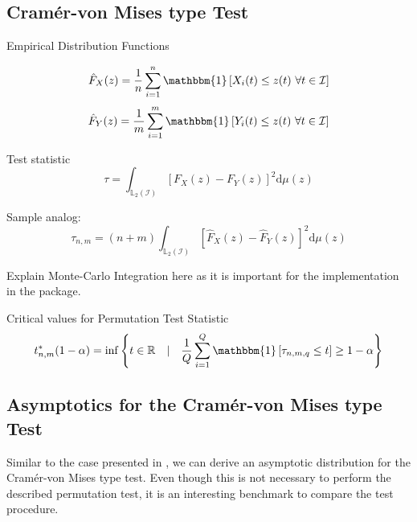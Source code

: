 \documentclass[12pt, a4paper]{article}
\theoremstyle{MAstyle} \newtheorem{assumption}{Assumption}[section]
\theoremstyle{MAstyle} \newtheorem{definition}{Definition}[section]
\begin{document}
		\subsection{Cram\'{e}r-von Mises type Test}
		
			Empirical Distribution Functions
			\begin{multicols}{2}
				\noindent
				\begin{equation*}
					\hat{F}_X(z) = \frac{1}{n} \sum_{i = 1}^{n}\mathbbm{1}\left[X_i(t) \leq z(t) \ \forall t \in \mathcal{I}\right]
				\end{equation*}
				\begin{equation}
					\hat{F}_Y(z) = \frac{1}{m} \sum_{i = 1}^{m}\mathbbm{1}\left[Y_i(t) \leq z(t) \ \forall t \in \mathcal{I}\right]
				\end{equation}
			\end{multicols}
			
			
			Test statistic
			\begin{equation}
				\tau = \int_{\mathbb{L}_2(\mathcal{I})}\left[F_X(z) - F_Y(z)\right]^2 \mathrm{d} \mu(z)
			\end{equation}
			
			Sample analog:
			\begin{equation}
				\tau_{n,m} = (n+m) \int_{\mathbb{L}_2(\mathcal{I})}\left[\hat{F}_X(z) - \hat{F}_Y(z)\right]^2 \mathrm{d} \mu(z)
			\end{equation}
		
			{\color{red} Explain Monte-Carlo Integration here as it is important for the implementation in the package.}
		
			Critical values for Permutation Test Statistic
			\begin{equation}
				t^{*}_{n,m}(1-\alpha) = \inf \left\{t \in \mathbb{R} \quad \vert \quad \frac{1}{Q} \sum_{i = 1}^{Q} \mathbbm{1}\left[\tau_{n,m,q} \leq t\right] \geq 1 - \alpha \right\}
			\end{equation}
		
		\subsection{Asymptotics for the Cram\'{e}r-von Mises type Test}
			Similar to the case presented in \cite{bugni_goodness--fit_2009}, we can derive an asymptotic distribution for the Cram\'{e}r-von Mises type test. Even though this is not necessary to perform the described permutation test, it is an interesting benchmark to compare the test procedure. \\
			
\end{document}
